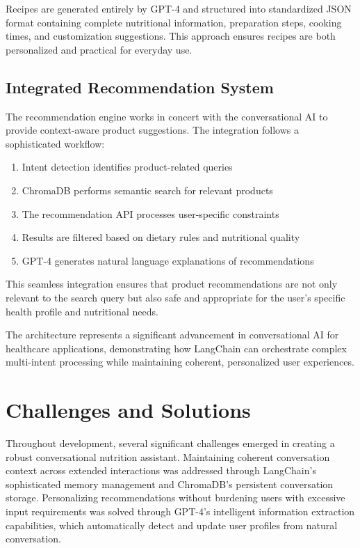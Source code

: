 Recipes are generated entirely by GPT-4 and structured into standardized JSON format containing complete nutritional information, preparation steps, cooking times, and customization suggestions. This approach ensures recipes are both personalized and practical for everyday use.

\subsection{Integrated Recommendation System}
The recommendation engine works in concert with the conversational AI to provide context-aware product suggestions. The integration follows a sophisticated workflow:
\begin{enumerate}
\item Intent detection identifies product-related queries
\item ChromaDB performs semantic search for relevant products
\item The recommendation API processes user-specific constraints
\item Results are filtered based on dietary rules and nutritional quality
\item GPT-4 generates natural language explanations of recommendations
\end{enumerate}

This seamless integration ensures that product recommendations are not only relevant to the search query but also safe and appropriate for the user's specific health profile and nutritional needs.

The architecture represents a significant advancement in conversational AI for healthcare applications, demonstrating how LangChain can orchestrate complex multi-intent processing while maintaining coherent, personalized user experiences.

\section{Challenges and Solutions}
Throughout development, several significant challenges emerged in creating a robust conversational nutrition assistant. Maintaining coherent conversation context across extended interactions was addressed through LangChain's sophisticated memory management and ChromaDB's persistent conversation storage. Personalizing recommendations without burdening users with excessive input requirements was solved through GPT-4's intelligent information extraction capabilities, which automatically detect and update user profiles from natural conversation.

